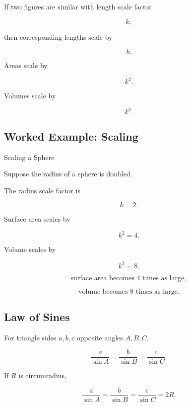 If two figures are similar with length scale factor

\[
k,
\]

then corresponding lengths scale by

\[
\boxed{
k.
}
\]

Areas scale by

\[
\boxed{
k^2.
}
\]

Volumes scale by

\[
\boxed{
k^3.
}
\]

\subsection{Worked Example: Scaling}
\label{subsec:worked-geometric-scaling}

\begin{workedexamplebox}{Scaling a Sphere}

Suppose the radius of a sphere is doubled.

The radius scale factor is

\[
k=2.
\]

Surface area scales by

\[
k^2=4.
\]

Volume scales by

\[
k^3=8.
\]

\begin{answerbox}
\[
\boxed{
\text{surface area becomes }4\text{ times as large},
}
\]

\[
\boxed{
\text{volume becomes }8\text{ times as large}.
}
\]
\end{answerbox}

\end{workedexamplebox}

\subsection{Law of Sines}
\label{subsec:law-of-sines-reference}

For triangle sides \(a,b,c\) opposite angles \(A,B,C\),

\[
\boxed{
\frac{a}{\sin A}
=
\frac{b}{\sin B}
=
\frac{c}{\sin C}.
}
\]

If \(R\) is circumradius,

\[
\boxed{
\frac{a}{\sin A}
=
\frac{b}{\sin B}
=
\frac{c}{\sin C}
=
2R.
}
\]

